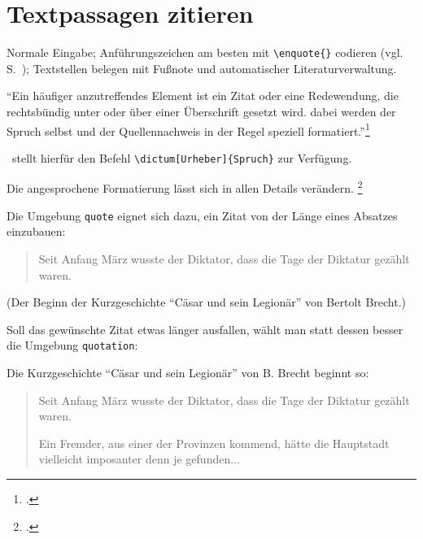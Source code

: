 \section{Textpassagen zitieren}


Normale Eingabe;
Anführungszeichen am besten mit \lstinline/\enquote{}/ codieren (vgl. S.~\pageref{enquote}); 
Textstellen belegen mit Fußnote und automatischer Literaturverwaltung.



\enquote{Ein häufiger anzutreffendes Element ist ein Zitat oder eine Redewendung, die rechtsbündig unter 
oder über einer Überschrift gesetzt wird. dabei werden der Spruch selbst und der Quellennachweis
in der Regel speziell formatiert.}\footcite[131]{kohm:2014}

\KOMAScript\ stellt hierfür den Befehl \lstinline/\dictum[Urheber]{Spruch}/ zur Verfügung.

Die angesprochene Formatierung lässt sich in allen Details verändern.
\footcite[vgl.][131\psqq]{kohm:2014}



Die Umgebung \lstinline/quote/ eignet sich dazu, ein Zitat von der Länge eines Absatzes einzubauen:

\begin{quote}
 Seit Anfang März wusste der Diktator, dass die Tage der Diktatur gezählt waren.
\end{quote}

(Der Beginn der Kurzgeschichte \enquote{Cäsar und sein Legionär} von Bertolt Brecht.)



Soll das gewünschte Zitat etwas länger ausfallen, wählt man statt dessen besser die 
Umgebung \lstinline/quotation/:

\begin{lfgwexample}{}
\usepackage[utf8]{inputenc}
\usepackage[T1]{fontenc}

Die Kurzgeschichte \enquote{Cäsar und sein Legionär} von B. Brecht beginnt so:

\begin{quote}
 Seit Anfang März wusste der Diktator, dass die Tage der Diktatur gezählt waren.

 Ein Fremder, aus einer der Provinzen kommend, hätte die Hauptstadt vielleicht imposanter
 denn je gefunden... 
\end{quote}
\end{lfgwexample}

